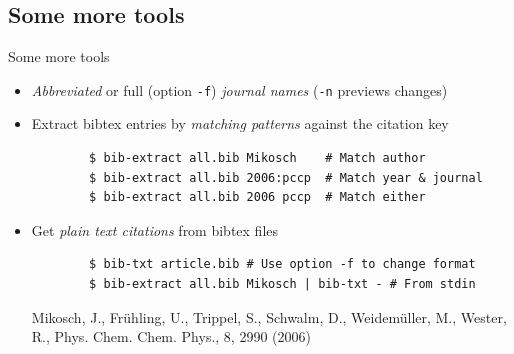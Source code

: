 \documentclass[xcolor={table,dvipsnames}]{beamer}
\renewcommand{\emph}[1]{\textit{\color{orange!90!brown}#1}}
\newcommand{\faint}{\color{black!10!gray}}
\newcommand{\bashcmd}[2][-0.6\baselineskip]{%
  \vspace{#1}%
}
\newcommand{\bashout}[2][-0.1\baselineskip]{%
  \vspace{#1}%
}
\begin{document}
\subsection{Some more tools}
\begin{frame}[fragile]{Some more tools}
  \begin{itemize}

    \item \emph{Abbreviated} or full (option {\faint\verb!-f!})
      \emph{journal names} ({\faint\verb!-n!} previews changes)
      \bashcmd{cmdline/jabbr/jabbr-1-in.txt}
      \bashout{cmdline/jabbr/jabbr-1-out.txt}

    \item Extract bibtex entries by \emph{matching patterns} against the citation key
      \begin{lstlisting}
        $ bib-extract all.bib Mikosch    # Match author
        $ bib-extract all.bib 2006:pccp  # Match year & journal
        $ bib-extract all.bib 2006 pccp  # Match either
      \end{lstlisting}

    \item Get \emph{plain text citations} from bibtex files
      \begin{lstlisting}
        $ bib-txt article.bib # Use option -f to change format
        $ bib-extract all.bib Mikosch | bib-txt - # From stdin
      \end{lstlisting}
      {\faint\footnotesize Mikosch, J., Frühling, U., Trippel, S., Schwalm, D.,
	Weidemüller, M., Wester, R., Phys. Chem. Chem. Phys., 8, 2990 (2006) }

  \end{itemize}
\end{frame}
\end{document}
